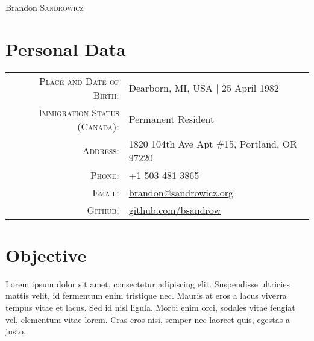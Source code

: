 \documentclass[a4paper,10pt]{article}
\begin{document}
\pagestyle{empty} %

\par{\centering
    {\Huge Brandon \textsc{Sandrowicz} }
    \bigskip\par}

\section{Personal Data}
\begin{tabular}{rl}
\textsc{Place and Date of Birth:}       & Dearborn, MI, USA | 25 April 1982\\
\textsc{Immigration Status (Canada):}   & Permanent Resident\\
\textsc{Address:}                       & 1820 104th Ave Apt \#15, Portland, OR 97220\\
\textsc{Phone:}                         & +1 503 481 3865\\
\textsc{Email:}                         & \href{mailto:brandon@sandrowicz.org}{brandon@sandrowicz.org}\\
\textsc{Github:}                        & \href{http://github.com/bsandrow}{github.com/bsandrow}\\
\end{tabular}

\section{Objective}
Lorem ipsum dolor sit amet, consectetur adipiscing elit. Suspendisse ultricies
mattis velit, id fermentum enim tristique nec. Mauris at eros a lacus viverra
tempus vitae et lacus. Sed id nisl ligula. Morbi enim orci, sodales vitae
feugiat vel, elementum vitae lorem. Cras eros nisi, semper nec laoreet quis,
egestas a justo.

\end{document}
